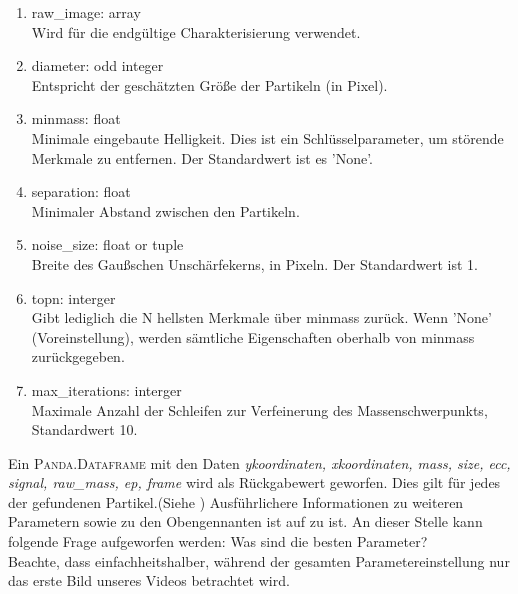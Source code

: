 		\begin{enumerate}
    			\item raw\_image: array \\
    			Wird für die endgültige Charakterisierung verwendet.
    			\item diameter: odd integer \\
    			Entspricht der geschätzten Größe der Partikeln (in Pixel).
    			\item minmass: float \\
    			Minimale eingebaute Helligkeit. Dies ist ein Schlüsselparameter, um störende 				Merkmale zu entfernen. Der Standardwert ist es 'None'.
    			\item separation: float\\
    			Minimaler Abstand zwischen den Partikeln.    			
    			\item noise\_size: float or tuple\\
    			Breite des Gaußschen Unschärfekerns, in Pixeln. Der Standardwert ist 1.
    			\item topn: interger\\
    			Gibt lediglich die N hellsten Merkmale über minmass zurück. Wenn 							'None' (Voreinstellung), werden sämtliche Eigenschaften oberhalb von minmass 				zurückgegeben.
    			\item max\_iterations: interger\\
    			Maximale Anzahl der Schleifen zur Verfeinerung des Massenschwerpunkts, 					Standardwert 10.
    			
		\end{enumerate}
		
Ein \textsc{Panda.Dataframe} mit den Daten \textit{y\-koordinaten, x\-koordinaten, mass, size, ecc, signal, raw\_mass, ep, frame} wird als Rückgabewert geworfen. Dies gilt für jedes der gefundenen Partikel.(Siehe )
Ausführlichere Informationen zu  weiteren Parametern sowie zu den Obengennanten ist auf zu ist.%
An dieser Stelle kann folgende Frage aufgeworfen werden: Was sind die besten Parameter? \\
Beachte, dass einfachheitshalber, während der gesamten Parametereinstellung nur das erste Bild unseres Videos betrachtet wird.

